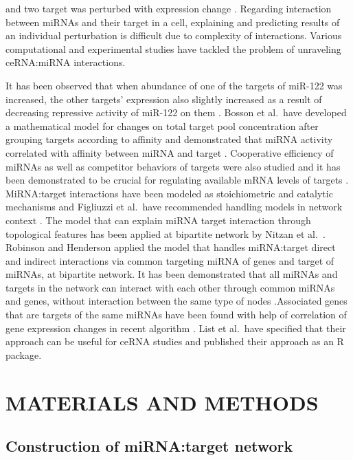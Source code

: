 \documentclass[a4,center,fleqn]{NAR}
\begin{document}
\enlargethispage{-65.1pt}

and two target was perturbed with expression change
\citep{ala_integrated_2013}. Regarding interaction between miRNAs and
their target in a cell, explaining and predicting results of an
individual perturbation is difficult due to complexity of interactions.
Various computational and experimental studies have tackled the problem
of unraveling ceRNA:miRNA interactions.

It has been observed that when abundance of one of the targets of
miR-122 was increased, the other targets' expression also slightly
increased as a result of decreasing repressive activity of miR-122 on
them \citep{denzler_assessing_2014}. Bosson et al.~have developed a
mathematical model for changes on total target pool concentration after
grouping targets according to affinity and demonstrated that miRNA
activity correlated with affinity between miRNA and target
\citep{bosson_endogenous_2014}. Cooperative efficiency of miRNAs as well
as competitor behaviors of targets were also studied and it has been
demonstrated to be crucial for regulating available mRNA levels of
targets \citep{denzler_impact_2016}. MiRNA:target interactions have been
modeled as stoichiometric and catalytic mechanisms and Figliuzzi et
al.~have recommended handling models in network context
\citep{figliuzzi_micrornas_2013}. The model that can explain miRNA
target interaction through topological features has been applied at
bipartite network by Nitzan et al.~\citep{nitzan_interactions_2014}.
Robinson and Henderson applied the model that handles miRNA:target
direct and indirect interactions via common targeting miRNA of genes and
target of miRNAs, at bipartite network. It has been demonstrated that
all miRNAs and targets in the network can interact with each other
through common miRNAs and genes, without interaction between the same
type of nodes \citep{robinson_modelling_2018}.Associated genes that are
targets of the same miRNAs have been found with help of correlation of
gene expression changes in recent algorithm
\citep{markus_list_sponge_2017}. List et al.~have specified that their
approach can be useful for ceRNA studies and published their approach as
an R package.

\section{\texorpdfstring{\textbf{MATERIALS AND METHODS}}{}}

\subsection{Construction of miRNA:target network}
\end{document}

